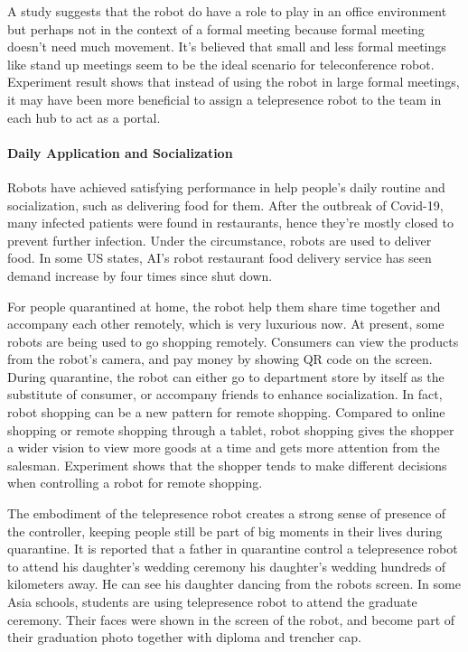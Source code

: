 \documentclass[a4paper]{article}
\begin{document}
\par 
    A study suggests that the robot do have a role to play in an office environment but perhaps not in the context of a formal meeting because formal meeting doesn't need much movement. It's believed that small and less formal meetings like stand up meetings seem to be the ideal scenario for teleconference robot. Experiment result shows that instead of using the robot in large formal meetings, it may have been more beneficial to assign a telepresence robot to the team in each hub to act as a portal.

\paragraph{Daily Application and Socialization}
    Robots have achieved satisfying performance in help people's daily routine and socialization, such as delivering food for them\cite{46}. After the outbreak of Covid-19, many infected patients were found in restaurants, hence they're mostly closed to prevent further infection. Under the circumstance, robots are used to deliver food. In some US states, AI's robot restaurant food delivery service has seen demand increase by four times since shut down\cite{47}.
\par 
    For people quarantined at home, the robot help them share time together and accompany each other remotely, which is very luxurious now. At present, some robots are being used to go shopping remotely\cite{48}. Consumers can view the products from the robot's camera, and pay money by showing QR code on the screen. During quarantine, the robot can either go to department store by itself as the substitute of consumer, or accompany friends to enhance socialization. In fact, robot shopping can be a new pattern for remote shopping. Compared to online shopping or remote shopping through a tablet, robot shopping gives the shopper a wider vision to view more goods at a time and gets more attention from the salesman\cite{49}. Experiment shows that the shopper tends to make different decisions when controlling a robot for remote shopping. 
\par 
    The embodiment of the telepresence robot creates a strong sense of presence of the controller, keeping people still be part of big moments in their lives during quarantine\cite{50}. It is reported that a father in quarantine control a telepresence robot to attend his daughter's wedding ceremony his daughter's wedding hundreds of kilometers away\cite{51}. He can see his daughter dancing from the robots screen. In some Asia schools, students are using telepresence robot to attend the graduate ceremony. Their faces were shown in the screen of the robot, and become part of their graduation photo together with diploma and trencher cap. 
\end{document}
